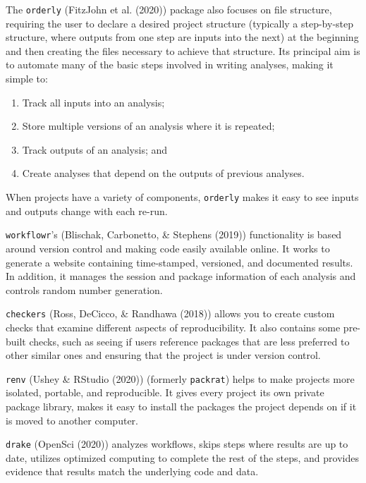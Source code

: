 \documentclass[12pt,twoside]{reedthesis}
\providecommand{\tightlist}{%
  \setlength{\itemsep}{0pt}\setlength{\parskip}{0pt}}
\begin{document}
The \texttt{orderly} (FitzJohn et al. (2020)) package also focuses on file structure, requiring the user to declare a desired project structure (typically a step-by-step structure, where outputs from one step are inputs into the next) at the beginning and then creating the files necessary to achieve that structure. Its principal aim is to automate many of the basic steps involved in writing analyses, making it simple to:
\begin{enumerate}
\def\labelenumi{\arabic{enumi})}
\tightlist
\item
  Track all inputs into an analysis;
\item
  Store multiple versions of an analysis where it is repeated;
\item
  Track outputs of an analysis; and
\item
  Create analyses that depend on the outputs of previous analyses.
\end{enumerate}
When projects have a variety of components, \texttt{orderly} makes it easy to see inputs and outputs change with each re-run.

\texttt{workflowr}'s (Blischak, Carbonetto, \& Stephens (2019)) functionality is based around version control and making code easily available online. It works to generate a website containing time-stamped, versioned, and documented results. In addition, it manages the session and package information of each analysis and controls random number generation.

\texttt{checkers} (Ross, DeCicco, \& Randhawa (2018)) allows you to create custom checks that examine different aspects of reproducibility. It also contains some pre-built checks, such as seeing if users reference packages that are less preferred to other similar ones and ensuring that the project is under version control.

\texttt{renv} (Ushey \& RStudio (2020)) (formerly \texttt{packrat}) helps to make projects more isolated, portable, and reproducible. It gives every project its own private package library, makes it easy to install the packages the project depends on if it is moved to another computer.

\texttt{drake} (OpenSci (2020)) analyzes workflows, skips steps where results are up to date, utilizes optimized computing to complete the rest of the steps, and provides evidence that results match the underlying code and data.
\end{document}

